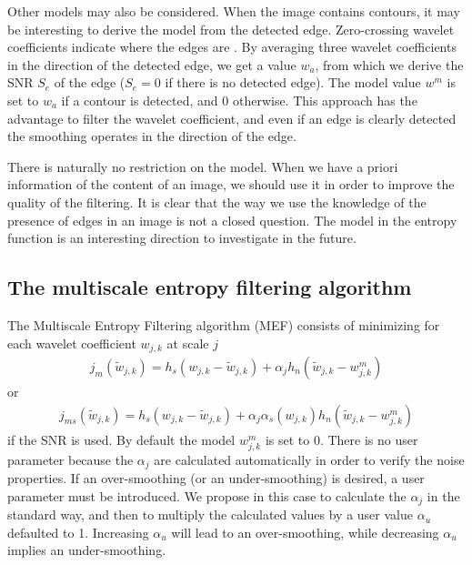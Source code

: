 Other models may also be considered. When the image contains 
contours, it may be interesting to derive the model from the detected edge.
Zero-crossing wavelet coefficients indicate where the edges are \cite{wave:mallat91}.
By averaging three wavelet coefficients in the direction of the detected edge,
we get a value $w_a$, from which we derive the SNR $S_e$ of the edge  
($S_e = 0$ if there is no detected edge). The model value $w^m$ is  
set to $w_a$ if a contour is detected, and $0$ otherwise. 
This approach has the advantage to filter the
wavelet coefficient, and even if an edge is clearly detected the smoothing
operates in the direction of the edge.

There is naturally no restriction on the model. 
When we have a priori information
of the content of an image, we should use it in order to improve the quality
of the filtering. It is clear that the way we use the knowledge of the presence
of edges in an image is not a closed question. The model in the entropy 
function is an interesting direction to investigate in the future. 


\subsection{The multiscale entropy filtering algorithm}

The Multiscale Entropy Filtering algorithm (MEF) consists of minimizing
for each wavelet coefficient $w_{j,k}$ at scale $j$
\begin{eqnarray}
j_m(\tilde w_{j,k}) = h_s(w_{j,k}-\tilde w_{j,k}) + \alpha_j h_n(\tilde w_{j,k} - w_{j,k}^m)
\end{eqnarray}
or 
\begin{eqnarray}
j_{ms}(\tilde w_{j,k}) = h_s(w_{j,k}-\tilde w_{j,k}) + \alpha_j \alpha_s(w_{j,k})  h_n(\tilde w_{j,k} - w_{j,k}^m)
\end{eqnarray}
if the SNR is used. By default the model $w_{j,k}^m$ is set to 0. There is no user
parameter because the $\alpha_j$ are calculated automatically in order to
verify the noise properties. If an over-smoothing (or an under-smoothing) 
is desired, a user parameter must be introduced. We propose in this case to
calculate the $\alpha_j$ in the standard way, and then to multiply the 
calculated values by a user value $\alpha_u$ defaulted to 1. 
Increasing $\alpha_u$
will lead to an over-smoothing, while 
decreasing $\alpha_u$ implies an under-smoothing.
 
